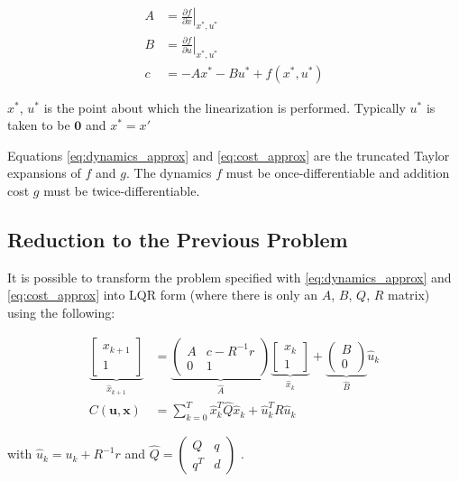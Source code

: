 \documentclass[letterpaper, 10pt, english, conference]{IEEEtran}
\begin{document}
\begin{align*}
A & =\left.\frac{\partial f}{\partial x}\right|_{x^{*},u^{*}}\\
B & =\left.\frac{\partial f}{\partial u}\right|_{x^{*},u^{*}}\\
c & =-Ax^{*}-Bu^{*}+f\left(x^{*},u^{*}\right)
\end{align*}


$x^{*}$, $u^{*}$ is the point about which the linearization is performed.
Typically $u^{*}$ is taken to be $\mathbf{0}$ and $x^{*}=x'$

Equations \ref{eq:dynamics_approx} and \ref{eq:cost_approx} are
the truncated Taylor expansions of $f$ and $g$. The dynamics $f$
must be once-differentiable and addition cost $g$ must be twice-differentiable.


\subsection{Reduction to the Previous Problem}

It is possible to transform the problem specified with \ref{eq:dynamics_approx}
and \ref{eq:cost_approx} into LQR form (where there is only an $A$,
$B$, $Q$, $R$ matrix) using the following:

\begin{align*}
\underbrace{\left[\begin{matrix}x_{k+1}\\
1
\end{matrix}\right]}_{\hat{x}_{k+1}} & =\underbrace{\left(\begin{matrix}A & c-R^{-1}r\\
0 & 1
\end{matrix}\right)}_{\hat{A}}\underbrace{\left[\begin{matrix}x_{k}\\
1
\end{matrix}\right]}_{\hat{x}_{k}}+\underbrace{\left(\begin{matrix}B\\
0
\end{matrix}\right)}_{\hat{B}}\hat{u}_{k}\\
C\left(\mathbf{u},\mathbf{x}\right) & =\sum_{k=0}^{T}\hat{x}_{k}^{T}\hat{Q}\hat{x}_{k}+\hat{u}_{k}^{T}R\hat{u}_{k}
\end{align*}


with $\hat{u}_{k}=u_{k}+R^{-1}r$ and $\hat{Q}=\left(\begin{matrix}Q & q\\
q^{T} & d
\end{matrix}\right)$ . 
\end{document}
